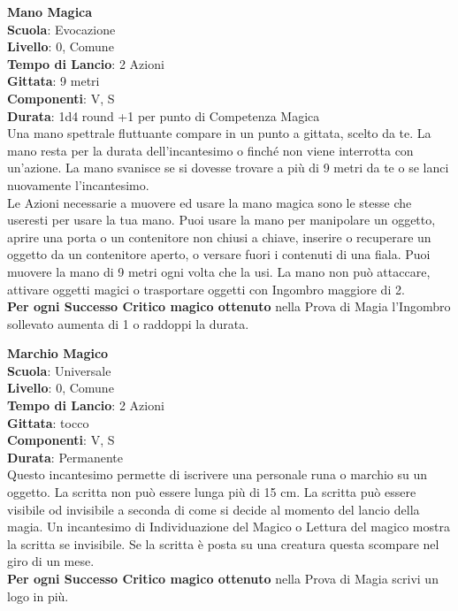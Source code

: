 \begin{multicols}{2}
\medskip\textbf{Mano Magica}\\
\textbf{Scuola}: Evocazione\\
\textbf{Livello}: 0, Comune\\
\textbf{Tempo di Lancio}: 2 Azioni\\
\textbf{Gittata}: 9 metri\\
\textbf{Componenti}: V, S\\
\textbf{Durata}: 1d4 round +1 per punto di Competenza Magica\\
Una mano spettrale fluttuante compare in un punto a gittata, scelto da te. La mano resta per la durata dell'incantesimo o finché non viene interrotta con un'azione. La mano svanisce se si dovesse trovare a più di 9 metri da te o se lanci nuovamente l'incantesimo.\\
Le Azioni necessarie a muovere ed usare la mano magica sono le stesse che useresti per usare la tua mano. Puoi usare la mano per manipolare un oggetto, aprire una porta o un contenitore non chiusi a chiave, inserire o recuperare un oggetto da un contenitore aperto, o versare fuori i contenuti di una fiala. Puoi muovere la mano di 9 metri ogni volta che la usi. La mano non può attaccare, attivare oggetti magici o trasportare oggetti con Ingombro maggiore di 2.\\
\textbf{Per ogni Successo Critico magico ottenuto} nella Prova di Magia l'Ingombro sollevato aumenta di 1 o raddoppi la durata.

\medskip\textbf{Marchio Magico}\\
\textbf{Scuola}: Universale\\
\textbf{Livello}: 0, Comune\\
\textbf{Tempo di Lancio}: 2 Azioni\\
\textbf{Gittata}: tocco\\
\textbf{Componenti}: V, S\\
\textbf{Durata}: Permanente\\
Questo incantesimo permette di iscrivere una personale runa o marchio su un oggetto. La scritta non può essere lunga più di 15 cm. La scritta può essere visibile od invisibile a seconda di come si decide al momento del lancio della magia.
Un incantesimo di Individuazione del Magico o Lettura del magico mostra la scritta se invisibile.
Se la scritta è posta su una creatura questa scompare nel giro di un mese.\\
\textbf{Per ogni Successo Critico magico ottenuto} nella Prova di Magia scrivi un logo in più.


\end{multicols}

